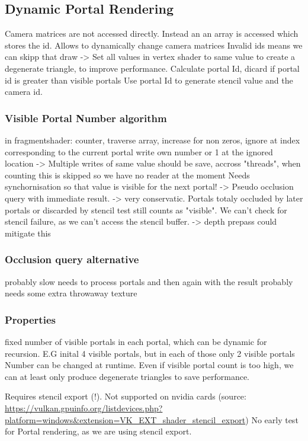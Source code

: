 \subsection{Dynamic Portal Rendering}
Camera matrices are not accessed directly. Instead an an array is accessed which stores the id. Allows to dynamically change camera matrices
Invalid ids means we can skipp that draw -> Set all values in vertex shader to same value to create a degenerate triangle, to improve performance.
Calculate portal Id, dicard if portal id is greater than visible portals
Use portal Id to generate stencil value and the camera id.


\subsubsection{Visible Portal Number algorithm}
in fragmentshader: counter, traverse array, increase for non zeros, ignore at index corresponding to the current portal
write own number or 1 at the ignored location -> Multiple writes of same value should be save, accross "threads", when counting this is skipped so we have no reader at the moment
Needs synchornisation so that value is visible for the next portal!
-> Pseudo occlusion query with immediate result.
-> very conservatic. Portals totaly occluded by later portals or discarded by stencil test still counts as "visible". We can't check for stencil failure, as we can't access the stencil buffer.
-> depth prepass could mitigate this

\subsubsection{Occlusion query alternative}
probably slow
needs to process portals and then again with the result
probably needs some extra throwaway texture

\subsubsection{Properties}
fixed number of visible portals in each portal, which can be dynamic for recursion. E.G inital 4 visible portals, but in each of those only 2 visible portals
Number can be changed at runtime.
Even if visible portal count is too high, we can at least only produce degenerate triangles to save performance.

Requires stencil export (!). Not supported on nvidia cards (source: \url{https://vulkan.gpuinfo.org/listdevices.php?platform=windows&extension=VK_EXT_shader_stencil_export})
No early test for Portal rendering, as we are using stencil export.



